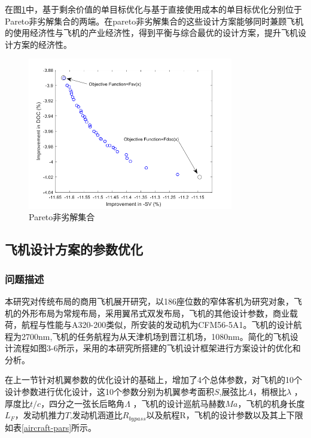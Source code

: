 \documentclass[12pt,a4paper]{report}
\begin{document}
在图\ref{pareto-doc-sv}中，基于剩余价值的单目标优化与基于直接使用成本的单目标优化分别位于Pareto非劣解集合的两端。在pareto非劣解集合的这些设计方案能够同时兼顾飞机的使用经济性与飞机的产业经济性，得到平衡与综合最优的设计方案，提升飞机设计方案的经济性。
\begin{figure}[ht!]
	\centering
	\includegraphics[width=0.8\textwidth]{./media4/pareto-doc-sv.png}
	\caption{Pareto非劣解集合}
	\label{pareto-doc-sv}
\end{figure}

\subsection{飞机设计方案的参数优化}
\subsubsection{问题描述}
本研究对传统布局的商用飞机展开研究，以186座位数的窄体客机为研究对象，飞机的外形布局为常规布局，采用翼吊式双发布局，飞机的其他设计参数，商业载荷，航程与性能与A320-200类似，所安装的发动机为CFM56-5A1。飞机的设计航程为2700nm,飞机的任务航程为从天津机场到晋江机场，1080nm。简化的飞机设计流程如图3-6所示，采用的本研究所搭建的飞机设计框架进行方案设计的优化和分析。

在上一节针对机翼参数的优化设计的基础上，增加了4个总体参数，对飞机的10个设计参数进行优化设计，这10个参数分别为机翼参考面积$S$,展弦比$A$，梢根比$\lambda$ ，厚度比$t/c$，四分之一弦长后略角$\Lambda$ ，飞机的设计巡航马赫数$Ma$，飞机的机身长度${{L}_{F}}$，发动机推力$T$,发动机涵道比${{R}_{bypass}}$以及航程R，飞机的设计参数以及其上下限如表\ref{aircraft-pars}所示。
\end{document}
